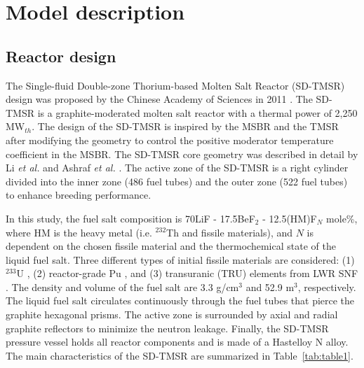\section{Model description} \label{Model-description}
\subsection{Reactor design}

The Single-fluid Double-zone Thorium-based Molten Salt Reactor (SD-TMSR) design was proposed by the Chinese Academy of Sciences in 2011 
\cite{li_optimization_2018,jiang2012advanced,li2015analysis,li2017model}. The \gls{SD-TMSR} is a graphite-moderated molten salt reactor with a thermal power of 2,250 MW$_{th}$. The 
design of the \gls{SD-TMSR} is inspired by the \gls{MSBR} 
\cite{robertson_conceptual_1971} and the \gls{TMSR} \cite{nuttin2005potential} after modifying the geometry to 
control the positive moderator temperature coefficient in the MSBR. The \gls{SD-TMSR} core 
geometry was described in detail by Li \emph{et al.} and Ashraf \emph{et al.}
\cite{li_optimization_2018,ashraf2019whole_core}. The active zone of the \gls{SD-TMSR} is a right cylinder divided into the inner zone (486 fuel tubes) and the outer zone (522 fuel tubes) to enhance breeding performance.

In this study, the fuel salt composition is 70LiF - 17.5BeF$_2$ - 12.5(HM)F$_N$ mole\%, where HM is the heavy metal (i.e. $^{232}$Th and fissile materials), and $N$ is dependent on the chosen fissile material and the thermochemical state of the liquid fuel salt. Three different types of initial fissile materials are considered: (1) $^{233}$U \cite{ashraf2019whole_core}, (2) reactor-grade Pu \cite{marka1993explosive}, and (3) transuranic (TRU) elements from \gls{LWR} \gls{SNF} \cite{de2000scenarios}.
The density and volume of the fuel salt are 3.3 g/cm$^{3}$ and 52.9 m$^3$, respectively.
The liquid fuel salt circulates continuously through the fuel tubes that pierce the graphite hexagonal 
prisms. The active zone is surrounded by axial and radial graphite reflectors to minimize the neutron leakage. Finally, the \gls{SD-TMSR} pressure vessel holds all reactor components and is made of a Hastelloy N alloy. The main 
characteristics of the \gls{SD-TMSR} are summarized in Table~\ref{tab:table1}.


